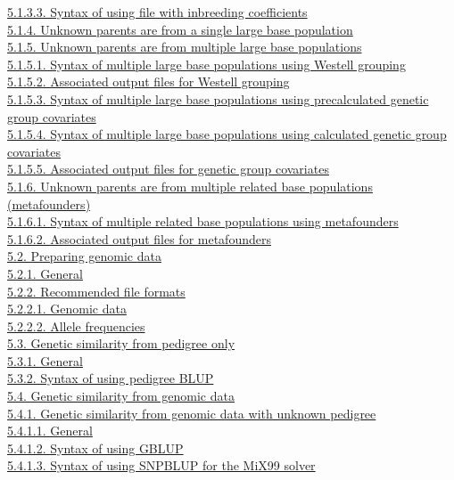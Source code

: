 \hyperref[Gene10]{5.1.3.3. Syntax of using file with inbreeding
coefficients}\\
\hyperref[Gene12]{5.1.4. Unknown parents are from a single large base
population}\\
\hyperref[Gene13]{5.1.5. Unknown parents are from multiple large base
populations}\\
\hyperref[Gene14]{5.1.5.1. Syntax of multiple large base populations
using Westell grouping}\\
\hyperref[Gene15]{5.1.5.2. Associated output files for Westell
grouping}\\
\hyperref[Gene16]{5.1.5.3. Syntax of multiple large base populations
using precalculated genetic group covariates}\\
\hyperref[Gene99]{5.1.5.4. Syntax of multiple large base populations
using calculated genetic group covariates}\\
\hyperref[Gene17]{5.1.5.5. Associated output files for genetic group
covariates}\\
\hyperref[Gene18]{5.1.6. Unknown parents are from multiple related base
populations (metafounders)}\\
\hyperref[Gene19]{5.1.6.1. Syntax of multiple related base populations
using metafounders}\\
\hyperref[Gene20]{5.1.6.2. Associated output files for metafounders}\\
\hyperref[Gene21]{5.2. Preparing genomic data}\\
\hyperref[Gene22]{5.2.1. General}\\
\hyperref[Gene23]{5.2.2. Recommended file formats}\\
\hyperref[Gene24]{5.2.2.1. Genomic data}\\
\hyperref[Gene25]{5.2.2.2. Allele frequencies}\\
\hyperref[Gene26]{5.3. Genetic similarity from pedigree only}\\
\hyperref[Gene27]{5.3.1. General}\\
\hyperref[Gene28]{5.3.2. Syntax of using pedigree BLUP}\\
\hyperref[Gene29]{5.4. Genetic similarity from genomic data}\\
\hyperref[Gene30]{5.4.1. Genetic similarity from genomic data with
unknown pedigree}\\
\hyperref[Gene31]{5.4.1.1. General}\\
\hyperref[Gene32]{5.4.1.2. Syntax of using GBLUP}\\
\hyperref[Gene33]{5.4.1.3. Syntax of using SNPBLUP for the MiX99
solver}\\
